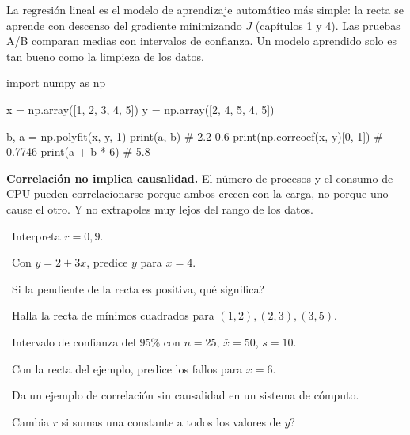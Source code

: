 \begin{tmsistemas}
La regresi\'on lineal es el modelo de aprendizaje autom\'atico m\'as simple: la recta se aprende con descenso del gradiente minimizando $J$ (cap\'itulos 1 y 4). Las pruebas A/B comparan medias con intervalos de confianza. Un modelo aprendido solo es tan bueno como la limpieza de los datos.
\end{tmsistemas}

\begin{tmcodigo}
import numpy as np

x = np.array([1, 2, 3, 4, 5])
y = np.array([2, 4, 5, 4, 5])

b, a = np.polyfit(x, y, 1)
print(a, b)                       # 2.2  0.6
print(np.corrcoef(x, y)[0, 1])    # 0.7746
print(a + b * 6)                  # 5.8
\end{tmcodigo}

\begin{tmcuidado}\textbf{Correlaci\'on no implica causalidad.} El n\'umero de procesos y el consumo de CPU pueden correlacionarse porque ambos crecen con la carga, no porque uno cause el otro. Y no extrapoles muy lejos del rango de los datos.\end{tmcuidado}

\begin{tmejercicios}
\label{ej:5-5}
\begin{tmlista}
\item \tmbasico\ Interpreta $r=0{,}9$.
\item \tmbasico\ Con $\hat y=2+3x$, predice $y$ para $x=4$.
\item \tmbasico\ Si la pendiente de la recta es positiva, \textquestiondown qu\'e significa?
\item \tmmedio\ Halla la recta de m\'inimos cuadrados para $(1, 2),(2, 3),(3, 5)$.
\item \tmmedio\ Intervalo de confianza del 95\% con $n=25$, $\bar x=50$, $s=10$.
\item \tmmedio\ Con la recta del ejemplo, predice los fallos para $x=6$.
\item \tmdificil\ Da un ejemplo de correlaci\'on sin causalidad en un sistema de c\'omputo.
\item \tmdificil\ \textquestiondown Cambia $r$ si sumas una constante a todos los valores de $y$?
\end{tmlista}
\end{tmejercicios}


